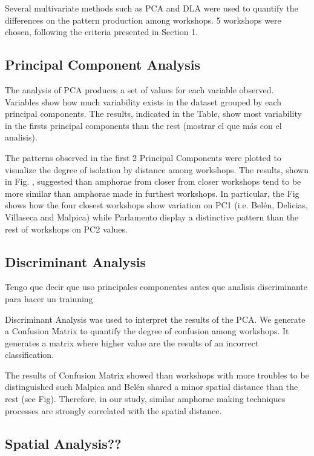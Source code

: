 \documentclass[review, twocolumn]{elsarticle}
\begin{document}
Several multivariate methods such as PCA and DLA were used to quantify the differences on the pattern production among workshops. 5 workshops were chosen, following the criteria presented in Section 1. 

\subsection{Principal Component Analysis}

The analysis of PCA produces a set of values for each variable observed. Variables show how much variability exists in the dataset grouped by each principal components. The results, indicated in the Table, show most variability in the firsts principal components than the rest (mostrar el que más con el analisis).

The patterns observed in the first 2 Principal Components were plotted to visualize the degree of isolation by distance among workshops. The results, shown in Fig. , suggested than amphorae from closer from closer workshops tend to be more similar than amphorae made in furthest workshops. In particular, the Fig shows how the four closest workshops show variation on PC1 (i.e. Belén, Delicias, Villaseca and Malpica) while Parlamento display a distinctive pattern than the rest of workshops on PC2 values. 


\subsection{Discriminant Analysis}

Tengo que decir que uso principales componentes antes que analisis discriminante para hacer un trainning 

Discriminant Analysis was used to interpret the results of the PCA. We generate a Confusion Matrix to quantify the degree of confusion among workshops. It generates a matrix where higher value are the results of an incorrect classification. 





The results of Confusion Matrix showed than workshops with more troubles to be distinguished such Malpica and Belén shared a minor spatial distance than the rest (see Fig). Therefore, in our study, similar amphorae making techniques processes are strongly correlated with the spatial distance. 

\subsection{Spatial Analysis??}
\end{document}
